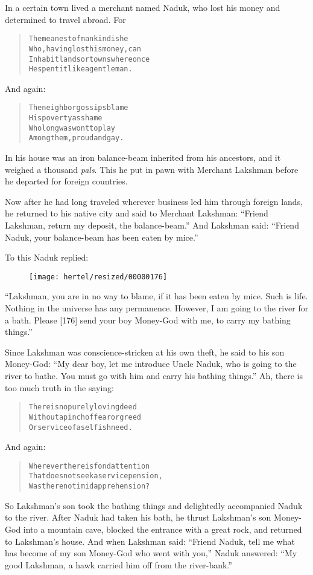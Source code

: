 \documentclass[article, twoside, 10pt]{memoir}
\renewenvironment{verbatim}{%
\begin{quote}%
\vskip -10pt%
\begin{alltt}\normalfont\small}{\end{alltt}%
\end{quote}%
\vskip -10pt
} %
\begin{document}
In a certain town lived a merchant named Naduk, who lost his money
and determined to travel abroad. For

\begin{verbatim}
The meanest of mankind is he
    Who, having lost his money, can
Inhabit lands or towns where once
    He spent it like a gentleman.
\end{verbatim}
And again:

\begin{verbatim}
The neighbor gossips blame
His poverty as shame
Who long was wont to play
Among them, proud and gay.
\end{verbatim}
In his house was an iron balance-beam inherited from his ancestors,
and it weighed a thousand \emph{pals}. This he put in pawn with
Merchant Lakshman before he departed for foreign countries.

Now after he had long traveled wherever business led him through
foreign lands, he returned to his native city and said to Merchant
Lakshman: ``Friend Lakshman, return my deposit, the balance-beam.''
And Lakshman said:
``Friend Naduk, your balance-beam has been eaten by mice.''

To this Naduk replied:
\begin{figure}[p]\texttt{[image: hertel/resized/00000176]}\end{figure}``Lakshman, you are in no way to blame, if it has been eaten by mice. Such is life. Nothing in the universe has any permanence. However, I am going to the river for a bath. Please [176] send your boy Money-God with me, to carry my bathing things.''

Since Lakshman was conscience-stricken at his own theft, he said to
his son Money-God:
``My dear boy, let me introduce Uncle Naduk, who is going to the river to bathe. You must go with him and carry his bathing things.''
Ah, there is too much truth in the saying:

\begin{verbatim}
There is no purely loving deed
Without a pinch of fear or greed
Or service of a selfish need.
\end{verbatim}
And again:

\begin{verbatim}
Wherever there is fond attention
That does not seek a service pension,
Was there no timid apprehension?
\end{verbatim}
So Lakshman's son took the bathing things and delightedly
accompanied Naduk to the river. After Naduk had taken his bath, he
thrust Lakshman's son Money-God into a mountain cave, blocked the
entrance with a great rock, and returned to Lakshman's house. And
when Lakshman said:
``Friend Naduk, tell me what has become of my son Money-God who went with you,''
Naduk answered:
``My good Lakshman, a hawk carried him off from the river-bank.''
\end{document}
